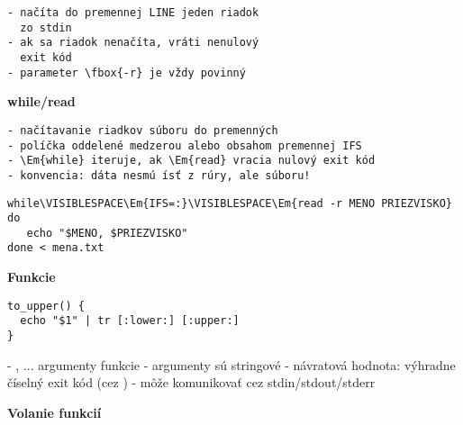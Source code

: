 \documentclass[8pt,landscape]{extarticle}
\newcommand{\Heading}[1]{%
{\begin{center}\bfseries\Large#1\end{center}}%
}%
\newcommand{\Em}[1]{\Ovalbox{\ttfamily #1}}
\def\VISIBLESPACE{{\tiny $\sqcup$}}
\newenvironment{karticka}[1]%
{%
\Heading{#1}%
}%
{%
\clearpage
}%
\begin{document}
%
\begin{Verbatim}[commandchars=\\\{\}]
- načíta do premennej LINE jeden riadok 
  zo stdin
- ak sa riadok nenačíta, vráti nenulový
  exit kód
- parameter \fbox{-r} je vždy povinný
\end{Verbatim}
\newpage
\begin{karticka}{while/read}
\begin{Verbatim}[commandchars=\\\{\}]
- načítavanie riadkov súboru do premenných
- políčka oddelené medzerou alebo obsahom premennej IFS
- \Em{while} iteruje, ak \Em{read} vracia nulový exit kód
- konvencia: dáta nesmú ísť z rúry, ale súboru!
\end{Verbatim}
%
\begin{middlecolorbox}
\begin{Verbatim}[commandchars=\\\{\}]
while\VISIBLESPACE\Em{IFS=:}\VISIBLESPACE\Em{read -r MENO PRIEZVISKO}
do
   echo "$MENO, $PRIEZVISKO"
done < mena.txt
\end{Verbatim}
\end{middlecolorbox}
\end{karticka}
\begin{karticka}{Funkcie}
\begin{Verbatim}
to_upper() {
  echo "$1" | tr [:lower:] [:upper:]
}
\end{Verbatim}
\begin{obsah}
- \Em{$1}, \Em{$2}... argumenty funkcie
- argumenty sú stringové
- návratová hodnota: výhradne číselný exit kód 
  (cez \Em{return})
- môže komunikovať cez stdin/stdout/stderr
\end{obsah}
\end{karticka}

\begin{karticka}{Volanie funkcií}
\end{karticka}
\end{document}
